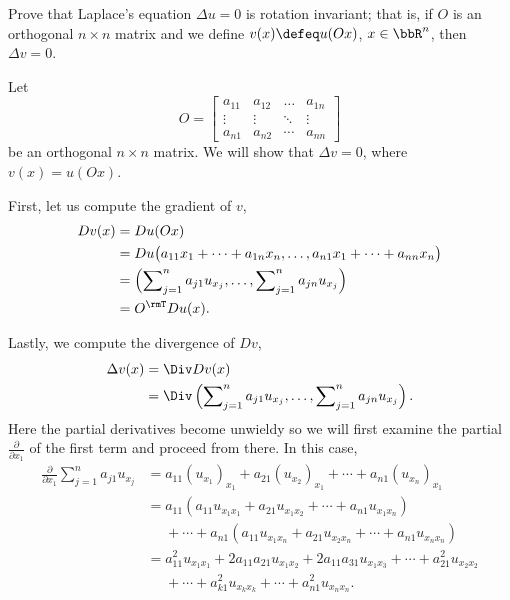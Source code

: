 \begin{problem}
  Prove that Laplace's equation \(\Delta u=0\) is rotation invariant; that
  is, if \(O\) is an orthogonal \(n\times n\) matrix and we define
  \(v(x)\defeq u(Ox)\), \(x\in\bbR^n\), then \(\Delta v=0\).
\end{problem}
\begin{solution}
  Let
  \[
    O=
    \begin{bmatrix}
      a_{11}&a_{12}&\dotsc&a_{1n}\\
      \vdots&\vdots&\ddots&\vdots\\
      a_{n1}&a_{n2}&\cdots&a_{nn}
    \end{bmatrix}
  \]
  be an orthogonal \(n\times n\) matrix. We will show that \(\Delta v=0\),
  where \(v(x)=u(Ox)\).

  First, let us compute the gradient of \(v\),
  \begin{align*}
    Dv(x)
    &=Du(Ox)\\
    &=Du\bigl(a_{11}x_1+\dotsb+a_{1n}x_n,\dotsc,a_{n1}x_1+\dotsb+a_{nn}x_n\bigr)\\
    &=\left(\sum\nolimits_{j=1}^na_{j1}u_{x_j},%
      \dotsc,%
      \sum\nolimits_{j=1}^n a_{jn}u_{x_j}\right)\\
    &=O^\rmT Du(x).
  \end{align*}

  Lastly, we compute the divergence of \(Dv\),
  \begin{align*}
    \Delta v(x)
    &=\Div Dv(x)\\
    &=\Div%
      \left(\sum\nolimits_{j=1}^na_{j1}u_{x_j},%
      \dotsc,%
      \sum\nolimits_{j=1}^n a_{jn}u_{x_j}\right).
  \end{align*}
  Here the partial derivatives become unwieldy so we will first examine the
  partial \(\frac{\partial}{\partial x_1}\) of the first term and proceed
  from there. In this case,
  \begin{align*}
    \frac{\partial}{\partial x_1}\sum_{j=1}^n a_{j1}u_{x_j}
    &=a_{11}(u_{x_1})_{x_1}%
      +a_{21}(u_{x_2})_{x_1}%
      +\dotsb%
      +a_{n1}(u_{x_n})_{x_1}\\
    &=a_{11}(a_{11}u_{x_1x_1}+a_{21}u_{x_1x_2}+\dotsb+a_{n1}u_{x_1x_n})\\
    &\phantom{{}={}}+\dotsb+a_{n1}(a_{11}u_{x_1x_n}+a_{21}u_{x_2x_n}%
      +\dotsb+a_{n1}u_{x_nx_n})\\
    &=a_{11}^2u_{x_1x_1}+2a_{11}a_{21}u_{x_1x_2}+2a_{11}a_{31}u_{x_1x_3}
      +\dotsb+a_{21}^2u_{x_2x_2}\\
    &\phantom{{}={}}+\dotsb+a_{k1}^2u_{x_kx_k}+\dotsb+a_{n1}^2u_{x_nx_n}.
  \end{align*}


\end{solution}
